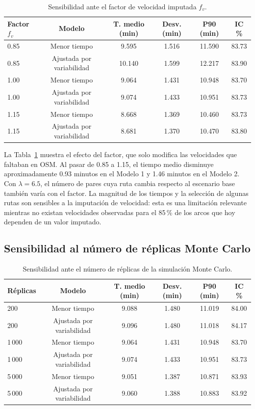 \documentclass[11pt]{article}
\numberwithin{equation}{section}
\begin{document}
\begin{table}[h!]
\centering
\small
\begin{tabular}{lccccc}
\toprule
\textbf{Factor $f_v$} & \textbf{Modelo} & \textbf{T. medio (min)} & \textbf{Desv. (min)} & \textbf{P90 (min)} & \textbf{IC \%} \\
\midrule
0.85 & Menor tiempo & 9.595 & 1.516 & 11.590 & 83.73 \\
0.85 & Ajustada por variabilidad & 10.140 & 1.599 & 12.217 & 83.90 \\
1.00 & Menor tiempo & 9.064 & 1.431 & 10.948 & 83.70 \\
1.00 & Ajustada por variabilidad & 9.074 & 1.433 & 10.951 & 83.73 \\
1.15 & Menor tiempo & 8.668 & 1.369 & 10.460 & 83.73 \\
1.15 & Ajustada por variabilidad & 8.681 & 1.370 & 10.470 & 83.80 \\
\bottomrule
\end{tabular}
\caption{Sensibilidad ante el factor de velocidad imputada $f_v$.}
\label{tab:sensibilidad_velocidad}
\end{table}

La Tabla~\ref{tab:sensibilidad_velocidad} muestra el efecto del factor, que solo modifica las velocidades que faltaban en OSM. Al pasar de 0.85 a 1.15, el tiempo medio disminuye aproximadamente 0.93 minutos en el Modelo 1 y 1.46 minutos en el Modelo 2. Con $\lambda=6.5$, el número de pares cuya ruta cambia respecto al escenario base también varía con el factor. La magnitud de los tiempos y la selección de algunas rutas son sensibles a la imputación de velocidad: esta es una limitación relevante mientras no existan velocidades observadas para el 85\,\% de los arcos que hoy dependen de un valor imputado.

\subsection{Sensibilidad al número de réplicas Monte Carlo}

\begin{table}[h!]
\centering
\small
\begin{tabular}{lccccc}
\toprule
\textbf{Réplicas} & \textbf{Modelo} & \textbf{T. medio (min)} & \textbf{Desv. (min)} & \textbf{P90 (min)} & \textbf{IC \%} \\
\midrule
200 & Menor tiempo & 9.088 & 1.480 & 11.019 & 84.00 \\
200 & Ajustada por variabilidad & 9.096 & 1.480 & 11.018 & 84.17 \\
1\,000 & Menor tiempo & 9.064 & 1.431 & 10.948 & 83.70 \\
1\,000 & Ajustada por variabilidad & 9.074 & 1.433 & 10.951 & 83.73 \\
5\,000 & Menor tiempo & 9.051 & 1.387 & 10.871 & 83.93 \\
5\,000 & Ajustada por variabilidad & 9.060 & 1.388 & 10.883 & 83.92 \\
\bottomrule
\end{tabular}
\caption{Sensibilidad ante el número de réplicas de la simulación Monte Carlo.}
\label{tab:sensibilidad_replicas}
\end{table}
\end{document}
